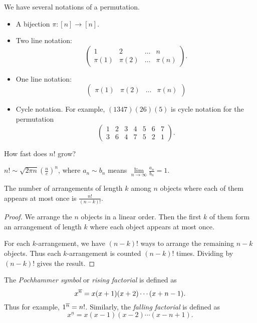We have several notations of a permutation.
\begin{itemize}
    \item A bijection $\pi\colon [n] \to [n]$.
    \item Two line notation: \[
        \begin{pmatrix}
            1 & 2 & \dots & n \\
            \pi(1) & \pi(2) & \dots & \pi(n)
        \end{pmatrix}.
    \]
    \item One line notation: \[
        \begin{pmatrix}
            \pi(1) & \pi(2) & \dots & \pi(n)
        \end{pmatrix}
    \]
    \item Cycle notation.
    For example, $(1347)(26)(5)$ is cycle notation for the permutation \[
        \begin{pmatrix}
            1 & 2 & 3 & 4 & 5 & 6 & 7 \\
            3 & 6 & 4 & 7 & 5 & 2 & 1
        \end{pmatrix}.
    \]
\end{itemize}
How fast does $n!$ grow?
\begin{fact*} \label{thm:permutations:stirling}
    $n! \sim \sqrt{2\pi n} \left( \frac{n}{e} \right)^n$, where
    $a_n \sim b_n$ means $\lim\limits_{n \to \infty} \frac{a_n}{b_n} = 1$.
\end{fact*}

\begin{proposition}
    The number of arrangements of length $k$ among $n$ objects where each
    of them appears at most once is $\frac{n!}{(n - k)!}$.
\end{proposition}
\begin{proof}
    We arrange the $n$ objects in a linear order.
    Then the first $k$ of them form an arrangement of length $k$ where each
    object appears at most once.

    For each $k$-arrangement, we have $(n-k)!$ ways to arrange the remaining
    $n-k$ objects.
    Thus each $k$-arrangement is counted $(n-k)!$ times.
    Dividing by $(n-k)!$ gives the result.
\end{proof}
\begin{notation}
    The \emph{Pochhammer symbol} or \emph{rising factorial} is defined as \[
        x^{\overline{n}} = x(x+1)(x+2) \cdots (x+n-1).
    \] Thus for example, $1^{\overline{n}} = n!$.
    Similarly, the \emph{falling factorial} is defined as \[
        x^{\underline{n}} = x(x-1)(x-2) \cdots (x-n+1).
    \]
\end{notation}

